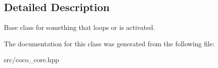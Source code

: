 \subsection{Detailed Description}
Base class for something that loops or is activated. 

The documentation for this class was generated from the following file\+:\begin{DoxyCompactItemize}
\item 
src/coco\+\_\+core.\+hpp\end{DoxyCompactItemize}
